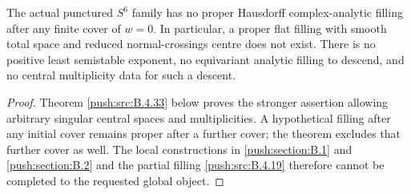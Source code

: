 \begin{corollary}\label{push:src:B.4.1}\label{push:B41}
The actual punctured $S^6$ family has no proper
Hausdorff complex-analytic filling after any finite
cover of $w=0$. In particular, a proper flat filling
with smooth total space and reduced normal-crossings
centre does not exist. There is no positive least
semistable exponent, no equivariant analytic filling
to descend, and no central multiplicity data for
such a descent.
\end{corollary}

\begin{proof}
Theorem \ref{push:src:B.4.33} below proves the stronger assertion
allowing arbitrary singular central spaces and
multiplicities. A hypothetical filling after any
initial cover remains proper after a further cover;
the theorem excludes that further cover as well.
The local constructions in \ref{push:section:B.1} and \ref{push:section:B.2} and the
partial filling \ref{push:src:B.4.19} therefore cannot be completed
to the requested global object.
\end{proof}